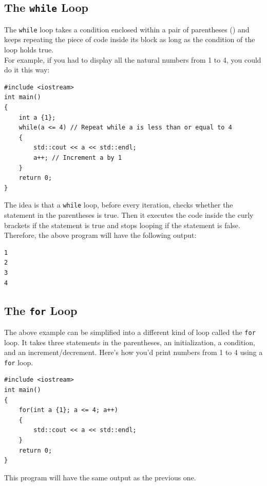 \documentclass[letterpaper, 12pt]{book}
\begin{document}
\subsection{The \lstinline{while} Loop}
The \lstinline{while} loop takes a condition enclosed within a pair of parentheses () and keeps repeating the piece of code inside its block as long as the condition of the loop holds true.\\
For example, if you had to display all the natural numbers from 1 to 4, you could do it this way:\\
\begin{lstlisting}
#include <iostream>
int main()
{
	int a {1};
	while(a <= 4) // Repeat while a is less than or equal to 4
	{
		std::cout << a << std::endl;
		a++; // Increment a by 1
	}
	return 0;
}
\end{lstlisting}
The idea is that a \lstinline{while} loop, before every iteration, checks whether the statement in the parentheses is true. Then it executes the code inside the curly brackets if the statement is true and stops looping if the statement is false.\\
Therefore, the above program will have the following output:

\begin{lstlisting}
1
2
3
4
\end{lstlisting}
\subsection{The \lstinline{for} Loop}
The above example can be simplified into a different kind of loop called the \lstinline{for} loop. It takes three statements in the parentheses, an initialization, a condition, and an increment/decrement. Here's how you'd print numbers from 1 to 4 using a \lstinline{for} loop.
\begin{lstlisting}
#include <iostream>
int main()
{
	for(int a {1}; a <= 4; a++)
	{
		std::cout << a << std::endl;
	}
	return 0;
}
\end{lstlisting}
This program will have the same output as the previous one.
\end{document}
